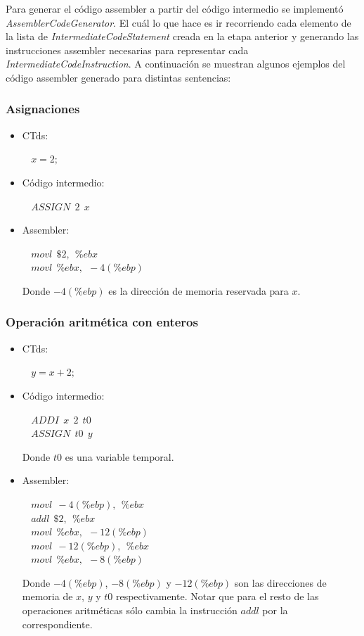 \documentclass[11pt,a4paper]{article}
\begin{document}
Para generar el código assembler a partir del código intermedio se implementó \textit{AssemblerCodeGenerator}. El cuál lo que hace es ir recorriendo cada elemento  de la lista de \textit{IntermediateCodeStatement} creada en la etapa anterior y generando las instrucciones assembler necesarias para representar cada \textit{IntermediateCodeInstruction}. A continuación se muestran algunos ejemplos del código assembler generado para distintas sentencias:
\subsubsection{Asignaciones}
\begin{itemize}
	\item CTds:
		\begin{flushleft}
			$\ \ \ \ x = 2 ;$
		\end{flushleft}
	\item Código intermedio:
		\begin{flushleft}
			$\ \ \ \ ASSIGN \ \ 2 \ \ x$
		\end{flushleft}
	\item Assembler:
		\begin{flushleft}
			$\ \ \ \ movl \ \ \$2, \ \ \%ebx $ \\
			$\ \ \ \ movl \ \ \%ebx, \ \ -4(\%ebp)$	
		\end{flushleft}
		Donde $-4(\%ebp)$ es la dirección de memoria reservada para $x$.
\end{itemize}
\subsubsection{Operación aritmética con enteros}
\label{subsec:enteros}
\begin{itemize}
	\item CTds:
		\begin{flushleft}
			$\ \ \ \ y = x + 2 ;$
		\end{flushleft}
	\item Código intermedio:
		\begin{flushleft}
			$\ \ \ \ ADDI \ \ x \ \ 2 \ \ t0$ \\
			$\ \ \ \ ASSIGN \ \ t0 \ \ y$
		\end{flushleft}
		Donde $t0$ es una variable temporal.
	\item Assembler:
		\begin{flushleft}
			$\ \ \ \ movl \ \ -4(\%ebp), \ \ \%ebx $ \\
			$\ \ \ \ addl \ \ \$2, \ \ \%ebx$ \\
			$\ \ \ \ movl \ \ \%ebx, \ \ -12(\%ebp)$ \\
			$\ \ \ \ movl \ \ -12(\%ebp), \ \ \%ebx$ \\
			$\ \ \ \ movl \ \ \%ebx, \ \ -8(\%ebp)$	
		\end{flushleft}
		Donde $-4(\%ebp)$, $-8(\%ebp)$ y $-12(\%ebp)$ son las direcciones de memoria de $x$, $y$ y $t0$ respectivamente. Notar que para el resto de las operaciones aritméticas sólo cambia la instrucción $addl$ por la correspondiente.
\end{itemize}
\end{document}
